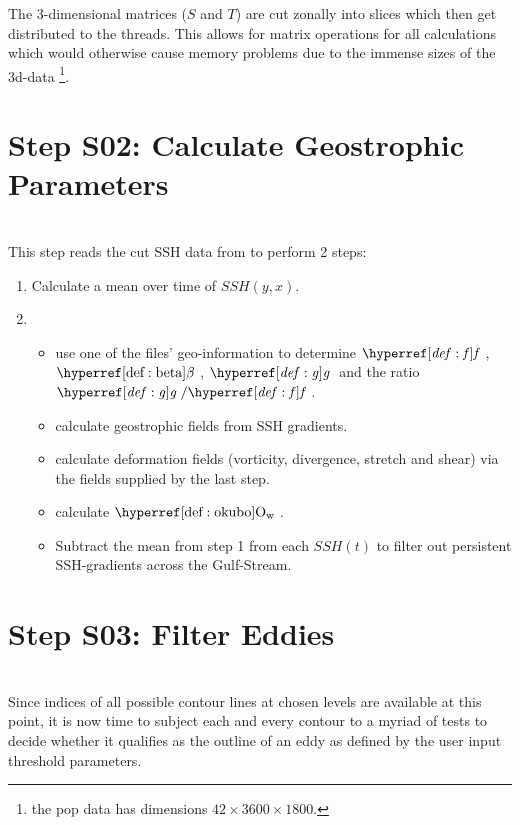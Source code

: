 The 3-dimensional matrices ($S$ and $T$) are cut zonally into slices which then get distributed to the threads. This allows for matrix operations for all calculations which would otherwise cause memory problems due to the immense sizes of the 3d-data \footnote{\Eg the pop data has dimensions $42 \times 3600 \times 1800 $.}.   


\section{Step S02: Calculate Geostrophic Parameters}
\\ 
This step reads the cut SSH data from  to perform 2 steps:
\begin{enumerate}
\item
Calculate a mean over time of $SSH(y,x)$.
	\item 
\begin{itemize}
	\item  use one of the files' geo-information to determine $\f$, $\dfdy$,
$\g$ and the ratio $\g/\f$.
\item
 calculate geostrophic fields from SSH gradients.
 \item
 calculate deformation fields (vorticity, divergence, stretch and shear) via the
fields supplied by the last step.
\item calculate $\okubo$.
\item
Subtract the mean from step 1 from each $SSH(t)$ to filter out persistent SSH-gradients \eg across the Gulf-Stream.
\end{itemize}


\end{enumerate}

\section{Step S03: Filter Eddies}
\\ 
Since indices of all possible contour lines at chosen levels are available at
this point, it is now time to subject each and every contour to a
myriad of tests to decide whether it qualifies as the outline of an eddy as
defined by the user input threshold parameters.
